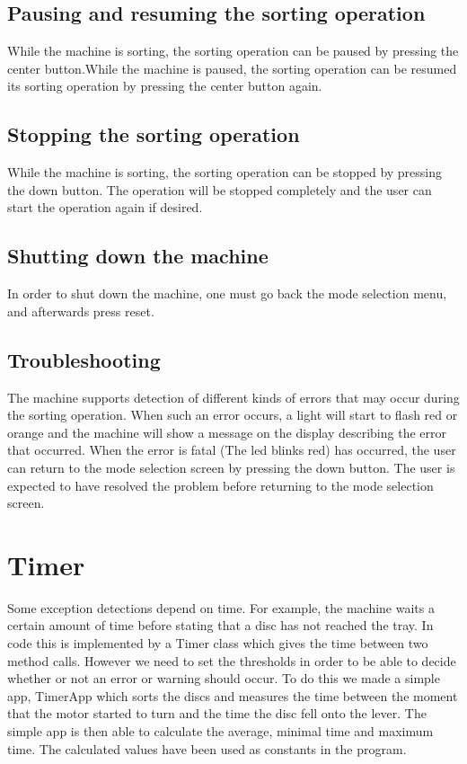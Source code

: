 \documentclass[a4paper,oneside,11pt]{article}
\begin{document}
\subsection{Pausing and resuming the sorting operation}
While the machine is sorting, the sorting operation can be paused by pressing the center button.While the machine is paused, the sorting operation can be resumed its sorting operation by pressing the center button again.

\subsection{Stopping the sorting operation}
While the machine is sorting, the sorting operation can be stopped by pressing the down button. The operation will be stopped completely and the user can start the operation again if desired.

\subsection{Shutting down the machine}
In order to shut down the machine, one must go back the mode selection menu, and afterwards press reset.

\subsection{Troubleshooting}
The machine supports detection of different kinds of errors that may occur during the sorting operation. When such an error occurs, a light will start to flash red or orange and the machine will show a message on the display describing the error that occurred. When the error is fatal (The led blinks red) has occurred, the user can return to the mode selection screen by pressing the down button. The user is expected to have resolved the problem before returning to the mode selection screen. 

\section{Timer}
Some exception detections depend on time. For example, the machine waits a certain amount of time before stating that a disc has not reached the tray. In code this is implemented by a Timer class which gives the time between two method calls. However we need to set the thresholds in order to be able to decide whether or not an error or warning should occur. To do this we made a simple app, TimerApp which sorts the discs and measures the time between the moment that the motor started to turn and the time the disc fell onto the lever. The simple app is then able to calculate the average, minimal time and maximum time. The calculated values have been used as constants in the program.
\end{document}
